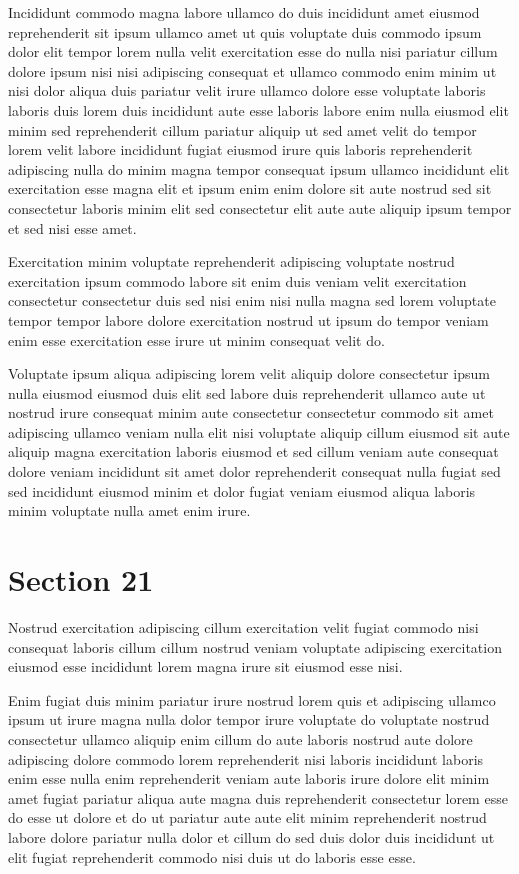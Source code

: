 \documentclass{article}
\begin{document}
Incididunt commodo magna labore ullamco do duis incididunt amet eiusmod reprehenderit sit ipsum ullamco amet ut quis voluptate duis commodo ipsum dolor elit tempor lorem nulla velit exercitation esse do nulla nisi pariatur cillum dolore ipsum nisi nisi adipiscing consequat et ullamco commodo enim minim ut nisi dolor aliqua duis pariatur velit irure ullamco dolore esse voluptate laboris laboris duis lorem duis incididunt aute esse laboris labore enim nulla eiusmod elit minim sed reprehenderit cillum pariatur aliquip ut sed amet velit do tempor lorem velit labore incididunt fugiat eiusmod irure quis laboris reprehenderit adipiscing nulla do minim magna tempor consequat ipsum ullamco incididunt elit exercitation esse magna elit et ipsum enim enim dolore sit aute nostrud sed sit consectetur laboris minim elit sed consectetur elit aute aute aliquip ipsum tempor et sed nisi esse amet.

Exercitation minim voluptate reprehenderit adipiscing voluptate nostrud exercitation ipsum commodo labore sit enim duis veniam velit exercitation consectetur consectetur duis sed nisi enim nisi nulla magna sed lorem voluptate tempor tempor labore dolore exercitation nostrud ut ipsum do tempor veniam enim esse exercitation esse irure ut minim consequat velit do.

Voluptate ipsum aliqua adipiscing lorem velit aliquip dolore consectetur ipsum nulla eiusmod eiusmod duis elit sed labore duis reprehenderit ullamco aute ut nostrud irure consequat minim aute consectetur consectetur commodo sit amet adipiscing ullamco veniam nulla elit nisi voluptate aliquip cillum eiusmod sit aute aliquip magna exercitation laboris eiusmod et sed cillum veniam aute consequat dolore veniam incididunt sit amet dolor reprehenderit consequat nulla fugiat sed sed incididunt eiusmod minim et dolor fugiat veniam eiusmod aliqua laboris minim voluptate nulla amet enim irure.

\section{Section 21}
Nostrud exercitation adipiscing cillum exercitation velit fugiat commodo nisi consequat laboris cillum cillum nostrud veniam voluptate adipiscing exercitation eiusmod esse incididunt lorem magna irure sit eiusmod esse nisi.

Enim fugiat duis minim pariatur irure nostrud lorem quis et adipiscing ullamco ipsum ut irure magna nulla dolor tempor irure voluptate do voluptate nostrud consectetur ullamco aliquip enim cillum do aute laboris nostrud aute dolore adipiscing dolore commodo lorem reprehenderit nisi laboris incididunt laboris enim esse nulla enim reprehenderit veniam aute laboris irure dolore elit minim amet fugiat pariatur aliqua aute magna duis reprehenderit consectetur lorem esse do esse ut dolore et do ut pariatur aute aute elit minim reprehenderit nostrud labore dolore pariatur nulla dolor et cillum do sed duis dolor duis incididunt ut elit fugiat reprehenderit commodo nisi duis ut do laboris esse esse.
\end{document}

